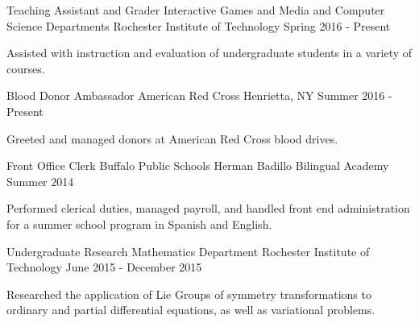 


\begin{cventries}


\cventry
{Teaching Assistant and Grader} %
{Interactive Games and Media and Computer Science Departments} %
{Rochester Institute of Technology} %
{Spring 2016 - Present} %
{ %
\begin{cvitems}
\item {Assisted with instruction and evaluation of undergraduate students in a variety of courses.}
\end{cvitems}
}


\cventry
{Blood Donor Ambassador} %
{American Red Cross} %
{Henrietta, NY} %
{Summer 2016 - Present} %
{ %
\begin{cvitems}
\item {Greeted and managed donors at American Red Cross blood drives.}
\end{cvitems}
}


\cventry
{Front Office Clerk} %
{Buffalo Public Schools} %
{Herman Badillo Bilingual Academy} %
{Summer 2014} %
{ %
\begin{cvitems}
\item {Performed clerical duties, managed payroll, and handled front end administration for a summer school program in Spanish and English.}
\end{cvitems} 
}


\cventry
{Undergraduate Research} %
{Mathematics Department} %
{Rochester Institute of Technology} %
{June 2015 - December 2015} %
{ %
\begin{cvitems}
\item {Researched the application of Lie Groups of symmetry transformations to ordinary and partial differential equations, as well as variational problems.}
\end{cvitems}
}


\end{cventries}
